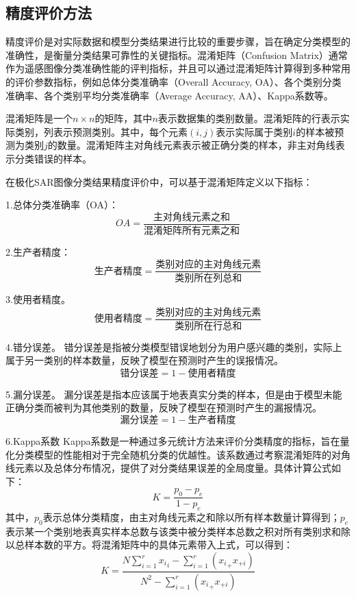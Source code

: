 \subsection{精度评价方法}
精度评价是对实际数据和模型分类结果进行比较的重要步骤，旨在确定分类模型的准确性，是衡量分类结果可靠性的关键指标。混淆矩阵（Confusion Matrix）通常作为遥感图像分类准确性能的评判指标，并且可以通过混淆矩阵计算得到多种常用的评价参数指标，例如总体分类准确率（Overall Accuracy, OA）、各个类别分类准确率、各个类别平均分类准确率（Average Accuracy, AA）、Kappa系数等。

混淆矩阵是一个$n \times n$的矩阵，其中$n$表示数据集的类别数量。混淆矩阵的行表示实际类别，列表示预测类别。其中，每个元素$(i, j)$表示实际属于类别$i$的样本被预测为类别$j$的数量。混淆矩阵主对角线元素表示被正确分类的样本，非主对角线表示分类错误的样本。

在极化SAR图像分类结果精度评价中，可以基于混淆矩阵定义以下指标：

1.总体分类准确率（OA）：
\begin{equation}
    OA=\frac{\mbox{主对角线元素之和}}{\mbox{混淆矩阵所有元素之和}}
\end{equation}

2.生产者精度：
\begin{equation}
    \mbox{生产者精度}=\frac{\mbox{类别对应的主对角线元素}}{\mbox{类别所在列总和}}
\end{equation}

3.使用者精度。
\begin{equation}
    \mbox{使用者精度}=\frac{\mbox{类别对应的主对角线元素}}{\mbox{类别所在行总和}}
\end{equation}

4.错分误差。
错分误差是指被分类模型错误地划分为用户感兴趣的类别，实际上属于另一类别的样本数量，反映了模型在预测时产生的误报情况。
\begin{equation}
    \mbox{错分误差}=1-\mbox{使用者精度}
\end{equation}

5.漏分误差。
漏分误差是指本应该属于地表真实分类的样本，但是由于模型未能正确分类而被判为其他类别的数量，反映了模型在预测时产生的漏报情况。
\begin{equation}
    \mbox{漏分误差}=1-\mbox{生产者精度}
\end{equation}

6.Kappa系数
Kappa系数是一种通过多元统计方法来评价分类精度的指标，旨在量化分类模型的性能相对于完全随机分类的优越性。该系数通过考察混淆矩阵的对角线元素以及总体分布情况，提供了对分类结果误差的全局度量。具体计算公式如下：
\begin{equation}
    K=\frac{p_0-p_e}{1-p_e}
\end{equation}
其中，$p_0$表示总体分类精度，由主对角线元素之和除以所有样本数量计算得到；$p_e$表示某一个类别地表真实样本总数与该类中被分类样本总数之积对所有类别求和除以总样本数的平方。将混淆矩阵中的具体元素带入上式，可以得到：
\begin{equation}
    K=\frac{N\sum_{i=1}^{r}{{x_i}_i}-\sum_{i=1}^{r}{\left( {x_i}_+x_{+i} \right)}}{N^2-\sum_{i=1}^{r}{\left( {x_i}_+x_{+i} \right)}}
\end{equation}

